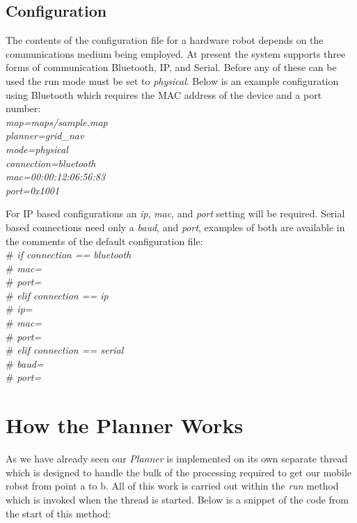 \subsection{Configuration}
\noindent
The contents of the configuration file for a hardware robot depends on the communications medium being employed. At present the system supports three forms of communication Bluetooth, IP, and Serial. Before any of these can be used the run mode must be set to \textit{physical}. Below is an example configuration using Bluetooth which requires the MAC address of the device and a port number: \\

	\indent \textit{map=maps/sample.map\\}
	\indent \textit{planner=grid\_nav\\}
	\indent \textit{mode=physical\\}
	\indent \textit{connection=bluetooth\\}
	\indent \textit{mac=00:00:12:06:56:83\\}
	\indent \textit{port=0x1001}
	
\noindent 
For IP based configurations an \textit{ip}, \textit{mac}, and \textit{port} setting will be required. Serial based connections need only a \textit{baud}, and \textit{port}, examples of both are available in the comments of the default configuration file: \\

	\indent \#   	\textit{if connection == bluetooth\\}
	\indent \#		\indent \textit{mac=\\}
	\indent \#      \indent \textit{port=\\}
	\indent \#   	\textit{elif connection == ip\\}
	\indent \#      \indent \textit{ip=\\}
	\indent \#      \indent \textit{mac=\\}
	\indent \#      \indent \textit{port=\\}
	\indent \#   	\textit{elif connection == serial\\}
	\indent \#      \indent \textit{baud=\\}
	\indent \#      \indent \textit{port=}


\section{How the Planner Works}
\noindent
As we have already seen our \textit{Planner} is implemented on its own separate thread which is designed to handle the bulk of the processing required to get our mobile robot from point a to b. All of this work is carried out within the \textit{run} method which is invoked when the thread is started. Below is a snippet of the code from the start of this method: \\

